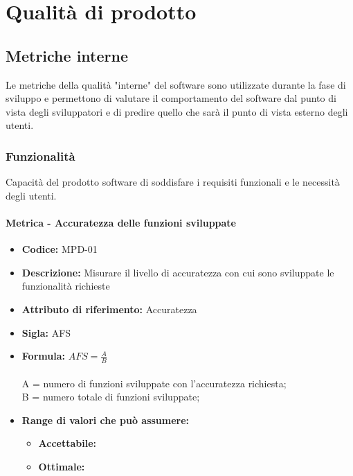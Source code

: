 
\section{Qualità di prodotto}
\subsection{Metriche interne}
 Le metriche della qualità "interne" del software sono utilizzate durante la fase di sviluppo e permettono di valutare il comportamento del software dal punto di vista degli sviluppatori e di predire quello che sarà il punto di vista esterno degli utenti.
  \subsubsection{Funzionalità}
      Capacità del prodotto software di soddisfare i requisiti funzionali e le necessità degli utenti.\\
      \paragraph{Metrica -  Accuratezza delle funzioni sviluppate} 
      \begin{itemize}
          \item  \textbf{Codice:} MPD-01
            \item  \textbf{Descrizione:} Misurare il livello di accuratezza con cui sono sviluppate le funzionalità richieste
            \item  \textbf{Attributo di riferimento:} Accuratezza 
           \item   \textbf{Sigla:} AFS
           \item   \textbf{Formula:} \begin{math}AFS = \frac{A}{B}\end{math}\\ \\
              A = numero di funzioni sviluppate con l'accuratezza richiesta;\\
              B = numero totale di funzioni sviluppate;
          \item \textbf{Range di valori che può assumere:}
        \begin{itemize}
            \item \textbf{Accettabile:} 
            \item \textbf{Ottimale:} 
        \end{itemize}
       \end{itemize}
              
